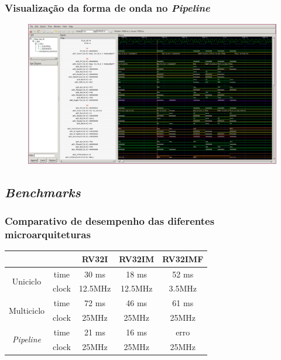 \documentclass[aspectratio=169]{beamer}
\begin{document}
    \begin{frame}
        \frametitle{Visualização da forma de onda no \textit{Pipeline}}
        \vfill
        \begin{figure}[H]
        \centering
            \includegraphics[width=.95\textwidth,height=.85\textheight,keepaspectratio]
            {../images/gtkwave/gtkwave_pipe.png}
        \end{figure}
        \vfill
    \end{frame}

    \subsection{\textit{Benchmarks}}
    \begin{frame}
        \frametitle{Comparativo de desempenho das diferentes microarquiteturas}
        \vfill
        \begin{longtable}{cc|c|c|c|}
            \cline{3-5}
                                                                    &                               & RV32I       & RV32IM      & RV32IMF   \\
            \hline
            \endhead
            \multicolumn{1}{|c}{\multirow{2}{*}{{Uniciclo}}}        & \multicolumn{1}{|c|}{time}    & 30 ms       & 18 ms       & 52 ms \\
            \cline{2-5}
            \multicolumn{1}{|c}{ }                                  & \multicolumn{1}{|c|}{clock}   & 12.5MHz     & 12.5MHz     & 3.5MHz \\
            \hline
            \multicolumn{1}{|c}{\multirow{2}{*}{{Multiciclo}}}      & \multicolumn{1}{|c|}{time}    & 72 ms       & 46 ms       & 61 ms \\
            \cline{2-5}
            \multicolumn{1}{|c}{ }                                  & \multicolumn{1}{|c|}{clock}   & 25MHz       & 25MHz       & 25MHz \\
            \hline
            \multicolumn{1}{|c}{\multirow{2}{*}{\textit{Pipeline}}} & \multicolumn{1}{|c|}{time}    & 21 ms       & 16 ms       & erro \\
            \cline{2-5}
            \multicolumn{1}{|c}{ }                                  & \multicolumn{1}{|c|}{clock}   & 25MHz       & 25MHz       & 25MHz \\
            \hline
        \end{longtable}
        \vfill
    \end{frame}
\end{document}
